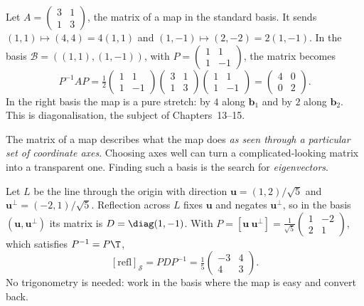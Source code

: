 \begin{example}\label{ex:diagbasis}
Let $A=\begin{pmatrix}3&1\\1&3\end{pmatrix}$, the matrix of a map in the standard basis. It sends $(1,1)\mapsto(4,4)=4(1,1)$ and $(1,-1)\mapsto(2,-2)=2(1,-1)$. In the basis $\mathcal{B}=((1,1),(1,-1))$, with $P=\begin{pmatrix}1&1\\1&-1\end{pmatrix}$, the matrix becomes
\[ P^{-1}AP=\tfrac12\begin{pmatrix}1&1\\1&-1\end{pmatrix}\begin{pmatrix}3&1\\1&3\end{pmatrix}\begin{pmatrix}1&1\\1&-1\end{pmatrix}=\begin{pmatrix}4&0\\0&2\end{pmatrix}. \]
In the right basis the map is a pure stretch: by $4$ along $\mathbf{b}_1$ and by $2$ along $\mathbf{b}_2$. This is diagonalisation, the subject of Chapters~13--15.
\end{example}

\begin{intuition}
The matrix of a map describes what the map does \emph{as seen through a particular set of coordinate axes}. Choosing axes well can turn a complicated-looking matrix into a transparent one. Finding such a basis is the search for \emph{eigenvectors}.
\end{intuition}

\begin{example}
Let $L$ be the line through the origin with direction $\mathbf{u}=(1,2)/\sqrt5$ and $\mathbf{u}^\perp=(-2,1)/\sqrt5$. Reflection across $L$ fixes $\mathbf{u}$ and negates $\mathbf{u}^\perp$, so in the basis $(\mathbf{u},\mathbf{u}^\perp)$ its matrix is $D=\diag(1,-1)$. With $P=[\mathbf{u}\ \mathbf{u}^\perp]=\frac1{\sqrt5}\begin{pmatrix}1&-2\\2&1\end{pmatrix}$, which satisfies $P^{-1}=P\T$,
\[ [\text{refl}]_{\mathcal{S}}=PDP^{-1}=\tfrac15\begin{pmatrix}-3&4\\4&3\end{pmatrix}. \]
No trigonometry is needed: work in the basis where the map is easy and convert back.
\end{example}

